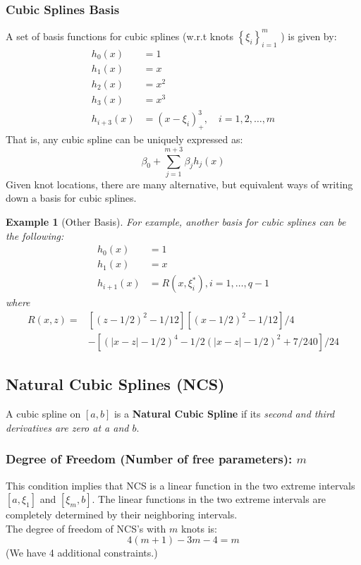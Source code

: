 \documentclass[11pt,a4paper]{article}
\newtheorem{example}{Example}
\begin{document}
\subsubsection{Cubic Splines Basis}
A set of basis functions for cubic splines (w.r.t knots $\left\{\xi_{i}\right\}_{i=1}^{m}$ ) is given by:
$$
\begin{aligned}
h_{0}(x) &=1 \\
h_{1}(x) &=x \\
h_{2}(x) &=x^{2} \\
h_{3}(x) &=x^{3} \\
h_{i+3}(x) &=\left(x-\xi_{i}\right)_{+}^{3}, \quad i=1,2, \ldots, m
\end{aligned}
$$
That is, any cubic spline can be uniquely expressed as:
$$
\beta_{0}+\sum_{j=1}^{m+3} \beta_{j} h_{j}(x)
$$
Given knot locations, there are many alternative, but equivalent ways of writing down a basis for cubic splines.
\begin{example}[Other Basis]
    For example, another basis for cubic splines can be the following:
    $$
    \begin{aligned}
    h_{0}(x) &=1 \\
    h_{1}(x) &=x \\
    h_{i+1}(x) &=R\left(x, \xi_{i}^{*}\right), i=1, \ldots, q-1
    \end{aligned}
    $$
    where
    $$
    \begin{aligned}
    R(x, z)=&\left[(z-1 / 2)^{2}-1 / 12\right]\left[(x-1 / 2)^{2}-1 / 12\right] / 4 \\
    &-\left[(|x-z|-1 / 2)^{4}-1 / 2(|x-z|-1 / 2)^{2}+7 / 240\right] / 24
    \end{aligned}
    $$
\end{example}

\subsection{Natural Cubic Splines (NCS)}
A cubic spline on $[a, b]$ is a \textbf{Natural Cubic Spline} if its \textit{second and third derivatives are zero at a and $b$}.
\subsubsection{Degree of Freedom (Number of free parameters): $m$}
This condition implies that NCS is a linear function in the two extreme intervals $\left[a, \xi_{1}\right]$ and $\left[\xi_{m}, b\right]$. The linear functions in the two extreme intervals are completely determined by their neighboring intervals.\\
The degree of freedom of NCS's with $m$ knots is:
$$
4(m+1)-3 m-4=m
$$
(We have 4 additional constraints.)
\end{document}
